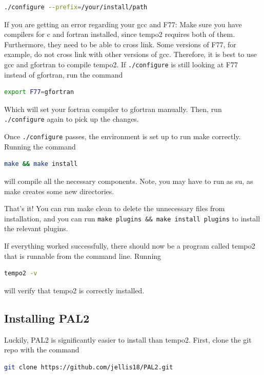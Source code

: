 \documentclass[12pt]{article}
\begin{document}
\begin{lstlisting}[language=bash]
./configure --prefix=/your/install/path
\end{lstlisting}

If you are getting an error regarding your gcc and F77:
Make sure you have compilers for c and fortran installed, since tempo2 requires
both of them. Furthermore, they need to be able to cross link.
Some versions of F77, for example, do not cross link with other versions of gcc.
Therefore, it is best to use gcc and gfortran to compile tempo2. If
\texttt{./configure}
is still looking at F77 instead of gfortran, run the command

\begin{lstlisting}[language=bash]
export F77=gfortran
\end{lstlisting}

Which will set your fortran compiler to gfortran manually. Then, run
\texttt{./configure}
again to pick up the changes.

Once \texttt{./configure} passes, the environment is set up to run make correctly.
Running the command

\begin{lstlisting}[language=bash]
make && make install
\end{lstlisting}

will compile all the necessary components. Note, you may have to run as su, as
make creates some new directories.

That's it! You can run make clean to delete the unnecessary files from
installation, and you can run \texttt{make plugins \&\& make install plugins} to install
the relevant plugins. 

If everything worked successfully, there should now be a program called tempo2 that
is runnable from the command line. Running 

\begin{lstlisting}[language=bash]
tempo2 -v
\end{lstlisting}

will verify that tempo2 is correctly installed.

\subsection{Installing PAL2}

Luckily, PAL2 is significantly easier to install than tempo2.
First, clone the git repo with the command
\\
\begin{lstlisting}[language=bash]
git clone https://github.com/jellis18/PAL2.git
\end{lstlisting}
\end{document}
